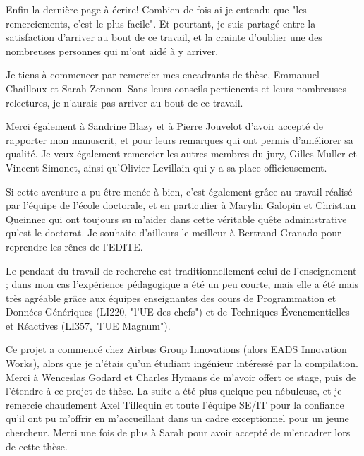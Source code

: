 
Enfin la dernière page à écrire! Combien de fois ai-je entendu que "les
remerciements, c'est le plus facile". Et pourtant, je suis partagé entre la
satisfaction d'arriver au bout de ce travail, et la crainte d'oublier une des
nombreuses personnes qui m'ont aidé à y arriver.


Je tiens à commencer par remercier mes encadrants de thèse, Emmanuel Chailloux
et Sarah Zennou. Sans leurs conseils pertienents et leurs nombreuses relectures,
je n'aurais pas arriver au bout de ce travail.


Merci également à Sandrine Blazy et à Pierre Jouvelot d'avoir accepté de
rapporter mon manuscrit, et pour leurs remarques qui ont permis d'améliorer sa
qualité. Je veux également remercier les autres membres du jury, Gilles Muller
et Vincent Simonet, ainsi qu'Olivier Levillain qui y a sa place officieusement.


Si cette aventure a pu être menée à bien, c'est également grâce au travail
réalisé par l'équipe de l'école doctorale, et en particulier à Marylin Galopin
et Christian Queinnec qui ont toujours su m'aider dans cette véritable quête
administrative qu'est le doctorat. Je souhaite d'ailleurs le meilleur à Bertrand
Granado pour reprendre les rênes de l'EDITE.


Le pendant du travail de recherche est traditionnellement celui de
l'enseignement ; dans mon cas l'expérience pédagogique a été un peu courte, mais
elle a été mais très agréable grâce aux équipes enseignantes des cours de
Programmation et Données Génériques (LI220, "l'UE des chefs") et de Techniques
Évenementielles et Réactives (LI357, "l'UE Magnum").


Ce projet a commencé chez Airbus Group Innovations (alors EADS Innovation
Works), alors que je n'étais qu'un étudiant ingénieur intéressé par la
compilation. Merci à Wenceslas Godard et Charles Hymans de m'avoir offert ce
stage, puis de l'étendre à ce projet de thèse. La suite a été plus quelque peu
nébuleuse, et je remercie chaudement Axel Tillequin et toute l'équipe SE/IT pour
la confiance qu'il ont pu m'offrir en m'accueillant dans un cadre exceptionnel
pour un jeune chercheur. Merci une fois de plus à Sarah pour avoir accepté de
m'encadrer lors de cette thèse.

